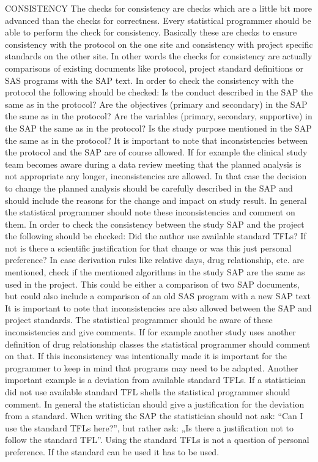 CONSISTENCY
The checks for consistency are checks which are a little bit more advanced than the checks for correctness. Every statistical programmer should be able to perform the check for consistency. Basically these are checks to ensure consistency with the protocol on the one site and consistency with project specific standards on the other site. In other words the checks for consistency are actually comparisons of existing documents like protocol, project standard definitions or SAS programs with the SAP text. In order to check the consistency with the protocol the following should be checked:
Is the conduct described in the SAP the same as in the protocol?
Are the objectives (primary and secondary) in the SAP the same as in the protocol?
Are the variables (primary, secondary, supportive) in the SAP the same as in the protocol?
Is the study purpose mentioned in the SAP the same as in the protocol?
It is important to note that inconsistencies between the protocol and the SAP are of course allowed. If for example the clinical study team becomes aware during a data review meeting that the planned analysis is not appropriate any longer, inconsistencies are allowed. In that case the decision to change the planned analysis should be carefully described in the SAP and should include the reasons for the change and impact on study result. In general the statistical programmer should note these inconsistencies and comment on them. In order to check the consistency between the study SAP and the project the following should be checked:
Did the author use available standard TFLs? If not is there a scientific justification for that change or was this just personal preference?
In case derivation rules like relative days, drug relationship, etc. are mentioned, check if the mentioned algorithms in the study SAP are the same as used in the project. This could be either a comparison of two SAP documents, but could also include a comparison of an old SAS program with a new SAP text
It is important to note that inconsistencies are also allowed between the SAP and project standards. The statistical programmer should be aware of these inconsistencies and give comments. If for example another study uses another definition of drug relationship classes the statistical programmer should comment on that. If this inconsistency was intentionally made it is important for the programmer to keep in mind that programs may need to be adapted.
Another important example is a deviation from available standard TFLs. If a statistician did not use available standard TFL shells the statistical programmer should comment. In general the statistician should give a justification for the deviation from a standard. When writing the SAP the statistician should not ask: “Can I use the standard TFLs here?”, but rather ask: „Is there a justification not to follow the standard TFL”. Using the standard TFLs is not a question of personal preference. If the standard can be used it has to be used.

